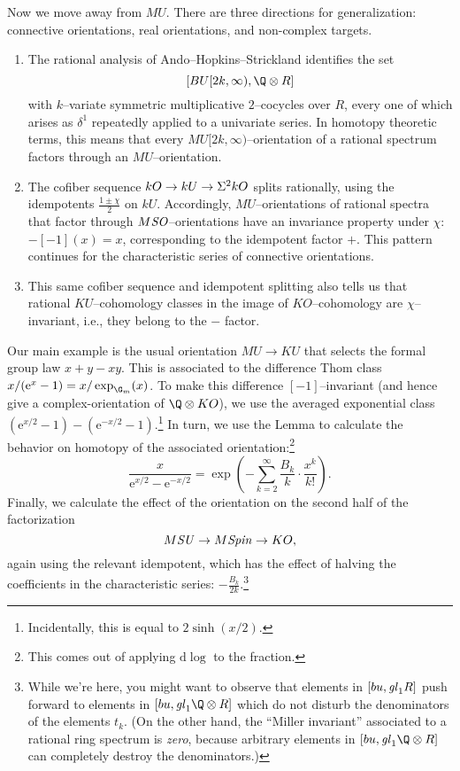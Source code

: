 Now we move away from \(MU\).  There are three directions for generalization: connective orientations, real orientations, and non-complex targets.
\begin{enumerate}
\item The rational analysis of Ando--Hopkins--Strickland identifies the set \[[BU[2k, \infty), \Q \otimes R]\] with \(k\)--variate symmetric multiplicative \(2\)--cocycles over \(R\), every one of which arises as \(\delta^1\) repeatedly applied to a univariate series.  In homotopy theoretic terms, this means that every \(MU[2k, \infty)\)--orientation of a rational spectrum factors through an \(MU\)--orientation.
\item The cofiber sequence \(kO \to kU \to \Sigma^2 kO\) splits rationally, using the idempotents \(\frac{1 \pm \chi}{2}\) on \(kU\).  Accordingly, \(MU\)--orientations of rational spectra that factor through \(M\mathit{SO}\)--orientations have an invariance property under \(\chi\): \(-[-1](x) = x\), corresponding to the idempotent factor \(+\).  This pattern continues for the characteristic series of connective orientations.
\item This same cofiber sequence and idempotent splitting also tells us that rational \(KU\)--cohomology classes in the image of \(KO\)--cohomology are \(\chi\)--invariant, i.e., they belong to the \(-\) factor.
\end{enumerate}

Our main example is the usual orientation \(MU \to KU\) that selects the formal group law \(x + y - xy\).  This is associated to the difference Thom class \(x / (\mathrm{e}^x - 1) = x / \exp_{\G_m}(x)\).  To make this difference \([-1]\)--invariant (and hence give a complex-orientation of \(\Q \otimes KO\)), we use the averaged exponential class \((\mathrm{e}^{x/2} - 1) - (\mathrm{e}^{-x/2} - 1)\).\footnote{Incidentally, this is equal to \(2\operatorname{sinh}(x/2)\).}  In turn, we use the Lemma to calculate the behavior on homotopy of the associated orientation:\footnote{This comes out of applying \(\mathrm{d}\log\) to the fraction.} \[\frac{x}{\mathrm e^{x/2} - \mathrm e^{-x/2}} = \exp\left(-\sum_{k=2}^\infty \frac{B_k}{k} \cdot \frac{x^k}{k!}\right).\]  Finally, we calculate the effect of the orientation on the second half of the factorization \[M\mathit{SU} \to M\mathit{Spin} \to KO,\] again using the relevant idempotent, which has the effect of halving the coefficients in the characteristic series: \(-\frac{B_k}{2k}\).\footnote{While we're here, you might want to observe that elements in \([bu, \mathit{gl}_1 R]\) push forward to elements in \([bu, \gl_1 \Q \otimes R]\) which do not disturb the denominators of the elements \(t_k\).  (On the other hand, the ``Miller invariant'' associated to a rational ring spectrum is \emph{zero}, because arbitrary elements in \([bu, \gl_1 \Q \otimes R]\) can completely destroy the denominators.)}

